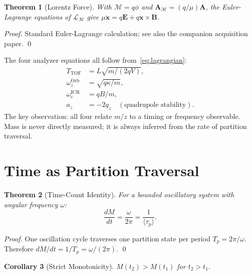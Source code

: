\documentclass[twocolumn,10pt,a4paper]{article}
\theoremstyle{thmstyle}
\newtheorem{theorem}{Theorem}[section]
\newtheorem{corollary}[theorem]{Corollary}
\theoremstyle{definition}
\theoremstyle{remark}
\newcommand{\LM}{\mathcal{L}_{\mathcal{M}}}
\newcommand{\AM}{\mathbf{A}_{\mathcal{M}}}
\newcommand{\Mop}{\mathcal{M}}
\newcommand{\tp}{\langle\tau_{p}\rangle}
\begin{document}
\begin{theorem}[Lorentz Force]
With $\Mop = q\phi$ and $\AM = (q/\mu)\mathbf{A}$, the Euler-Lagrange
equations of $\LM$ give $\mu\ddot{\mathbf{x}} = q\mathbf{E} + q\dot{\mathbf{x}}\times\mathbf{B}$.
\end{theorem}

\begin{proof}
Standard Euler-Lagrange calculation; see also the companion acquisition
paper. \qed
\end{proof}

The four analyzer equations all follow from~\eqref{eq:lagrangian}:
\begin{align}
T_{\mathrm{TOF}} &= L\sqrt{m/(2qV)}, \label{eq:tof}\\
\omega_z^{\mathrm{Orb}} &= \sqrt{q\kappa/m}, \label{eq:orb}\\
\omega_c^{\mathrm{ICR}} &= qB/m, \label{eq:icr}\\
a_z &= -2q_z \quad (\text{quadrupole stability}). \label{eq:quad}
\end{align}
The key observation: all four relate $m/z$ to a timing or frequency
observable. Mass is never directly measured; it is always inferred from
the rate of partition traversal.

\section{Time as Partition Traversal}
\label{sec:timecount}

\begin{theorem}[Time-Count Identity]
\label{thm:timecount}
For a bounded oscillatory system with angular frequency $\omega$:
\begin{equation}
\frac{dM}{dt} = \frac{\omega}{2\pi} = \frac{1}{\tp}.
\label{eq:timecount}
\end{equation}
\end{theorem}

\begin{proof}
One oscillation cycle traverses one partition state per period
$T_p = 2\pi/\omega$. Therefore $dM/dt = 1/T_p = \omega/(2\pi)$. \qed
\end{proof}

\begin{corollary}[Strict Monotonicity]
$M(t_2) > M(t_1)$ for $t_2 > t_1$.
\end{corollary}
\end{document}
